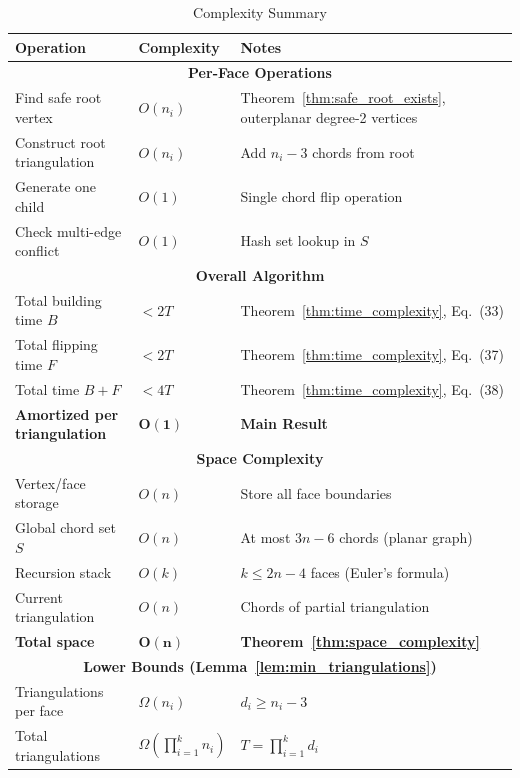 \documentclass[12pt,a4paper]{article}
\theoremstyle{definition}
\theoremstyle{remark}
\begin{document}
\begin{table}[H]
\centering
\caption{Complexity Summary}
\label{tab:complexity_summary}
\small
\begin{tabular}{|l|l|p{7cm}|}
\hline
\textbf{Operation} & \textbf{Complexity} & \textbf{Notes} \\
\hline
\multicolumn{3}{|c|}{\textbf{Per-Face Operations}} \\
\hline
Find safe root vertex & $O(n_i)$ & Theorem~\ref{thm:safe_root_exists}, outerplanar degree-2 vertices \\
\hline
Construct root triangulation & $O(n_i)$ & Add $n_i-3$ chords from root \\
\hline
Generate one child & $O(1)$ & Single chord flip operation \\
\hline
Check multi-edge conflict & $O(1)$ & Hash set lookup in $S$ \\
\hline
\multicolumn{3}{|c|}{\textbf{Overall Algorithm}} \\
\hline
Total building time $B$ & $< 2T$ & Theorem~\ref{thm:time_complexity}, Eq.~(33) \\
\hline
Total flipping time $F$ & $< 2T$ & Theorem~\ref{thm:time_complexity}, Eq.~(37) \\
\hline
Total time $B + F$ & $< 4T$ & Theorem~\ref{thm:time_complexity}, Eq.~(38) \\
\hline
\textbf{Amortized per triangulation} & $\mathbf{O(1)}$ & \textbf{Main Result} \\
\hline
\multicolumn{3}{|c|}{\textbf{Space Complexity}} \\
\hline
Vertex/face storage & $O(n)$ & Store all face boundaries \\
\hline
Global chord set $S$ & $O(n)$ & At most $3n-6$ chords (planar graph) \\
\hline
Recursion stack & $O(k)$ & $k \leq 2n-4$ faces (Euler's formula) \\
\hline
Current triangulation & $O(n)$ & Chords of partial triangulation \\
\hline
\textbf{Total space} & $\mathbf{O(n)}$ & \textbf{Theorem~\ref{thm:space_complexity}} \\
\hline
\multicolumn{3}{|c|}{\textbf{Lower Bounds (Lemma~\ref{lem:min_triangulations})}} \\
\hline
Triangulations per face & $\Omega(n_i)$ & $d_i \geq n_i - 3$ \\
\hline
Total triangulations & $\Omega\left(\prod_{i=1}^{k} n_i\right)$ & $T = \prod_{i=1}^{k} d_i$ \\
\hline
\end{tabular}
\end{table}
\end{document}
